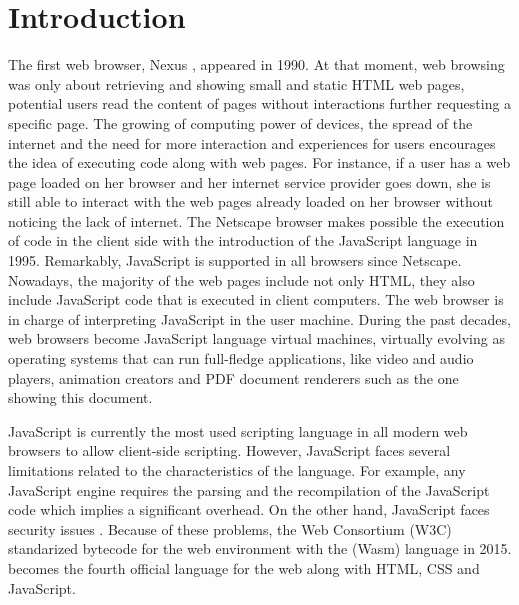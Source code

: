 \chapter{Introduction}
\label{chapter:intro}


The first web browser, Nexus \cite{nexus}, appeared in 1990.
At that moment, web browsing was only about retrieving and showing small and static HTML web pages, \ie potential users read the content of  pages without interactions further requesting a specific page.
The growing of computing power of devices, the spread of the internet and the need for more interaction and experiences for users encourages the idea of executing code along with web pages.
For instance, if a user has a web page loaded on her browser and her internet service provider goes down, she is still able to interact with the web pages already loaded on her browser without noticing the lack of internet.
The Netscape browser makes possible the execution of code in the client side with the introduction of the JavaScript language in 1995.
Remarkably, JavaScript is supported in all browsers since Netscape.
Nowadays, the majority of the web pages include not only HTML, they also include JavaScript code that is executed in client computers.
The web browser is in charge of interpreting JavaScript in the user machine.
During the past decades, web browsers become JavaScript language virtual machines, virtually evolving as operating systems that can run full-fledge applications, like video and audio players, animation creators and PDF document renderers such as the one showing this document.

JavaScript is currently the most used scripting language in all modern web browsers to allow client-side scripting. 
However, JavaScript faces several limitations related to the characteristics of the language. For example, any JavaScript engine requires the parsing and the recompilation of the JavaScript code which implies a significant overhead.
On the other hand, JavaScript faces security issues \cite{10.1145/1190216.1190252}.
Because of these problems, the Web Consortium (W3C) standarized bytecode for the web environment with the \wasm (Wasm) language in 2015. 
\wasm becomes the fourth official language for the web along with HTML, CSS and JavaScript.

